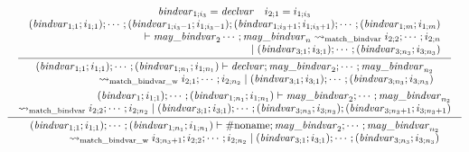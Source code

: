 \begin{gather*}
    \infer{\begin{array}{r}
        (\mathit{bindvar}_{1;1}; i_{1;1}); \cdots; (\mathit{bindvar}_{1;n_1}; i_{1;n_1}) \vdash \mathit{declvar}; \mathit{may\_bindvar}_2; \cdots; \mathit{may\_bindvar}_{n_2}
        \\
        \rightsquigarrow_\mathrm{match\_bindvar\_w} i_{2;1}; \cdots; i_{2;n_2} \mid (\mathit{bindvar}_{3;1}; i_{3;1}); \cdots; (\mathit{bindvar}_{3;n_3}; i_{3;n_3})
    \end{array}}{
        \begin{array}{c}
            \mathit{bindvar}_{1;i_3} = \mathit{declvar}
            \hspace{1em}
            i_{2;1} = i_{1;i_3}
            \\
            \begin{array}{r}
                (\mathit{bindvar}_{1;1}; i_{1;1}); \cdots; (\mathit{bindvar}_{1;i_3 - 1}; i_{1;i_3 - 1}); (\mathit{bindvar}_{1;i_3 + 1}; i_{1;i_3 + 1}); \cdots; (\mathit{bindvar}_{1;m}; i_{1;m})
                \\
                \vdash \mathit{may\_bindvar}_2 \cdots; \mathit{may\_bindvar}_n \rightsquigarrow_\mathrm{match\_bindvar} i_{2;2}; \cdots; i_{2;n}
                \\
                \mid (\mathit{bindvar}_{3;1}; i_{3;1}); \cdots; (\mathit{bindvar}_{3;n_3}; i_{3;n_3})
            \end{array}
        \end{array}
    }
    \\
    \infer{\begin{array}{r}
        (\mathit{bindvar}_{1;1}; i_{1;1}); \cdots; (\mathit{bindvar}_{1;n_1}; i_{1;n_1}) \vdash \mathrm{\#noname}; \mathit{may\_bindvar}_2; \cdots; \mathit{may\_bindvar}_{n_2}
        \\
        \rightsquigarrow_\mathrm{match\_bindvar\_w} i_{3;n_3 + 1}; i_{2;2}; \cdots; i_{2;n_2} \mid (\mathit{bindvar}_{3;1}; i_{3;1}); \cdots; (\mathit{bindvar}_{3;n_3}; i_{3;n_3})
    \end{array}}{
        \begin{array}{c}
            \begin{array}{r}
                (\mathit{bindvar}_1; i_{1;1}); \cdots; (\mathit{bindvar}_{1;n_1}; i_{1;n_1}) \vdash \mathit{may\_bindvar}_2; \cdots; \mathit{may\_bindvar}_{n_2}
                \\
                \rightsquigarrow_\mathrm{match\_bindvar} i_{2;2}; \cdots; i_{2;n_2} \mid (\mathit{bindvar}_{3;1}; i_{3;1}); \cdots; (\mathit{bindvar}_{3;n_3}; i_{3;n_3}); (\mathit{bindvar}_{3;n_3 + 1}; i_{3;n_3 + 1})
            \end{array}
        \end{array}
    }
\end{gather*}

